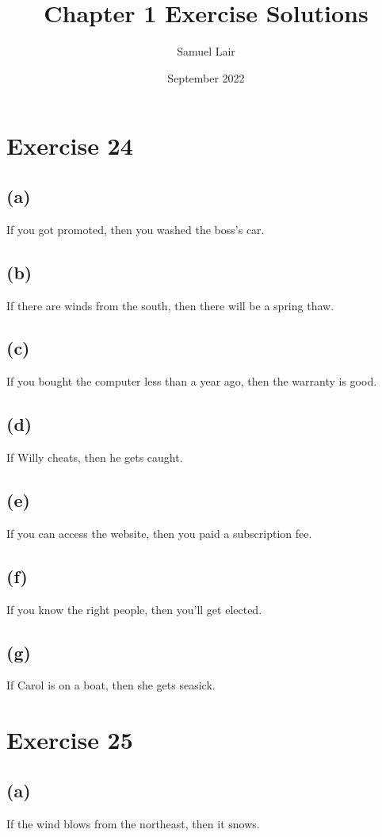 \documentclass{article}
\title{Chapter 1 Exercise Solutions}
\author{Samuel Lair}
\date{September 2022}
\begin{document}
	
	\maketitle
	\tableofcontents
	
	\pagebreak
	
	\section{Exercise 24}
	\subsection{(a)}
	If you got promoted, then you washed the boss's car.
	\subsection{(b)}
	If there are winds from the south, then there will be a spring thaw.
	\subsection{(c)}
	If you bought the computer less than a year ago, then the warranty is good.
	\subsection{(d)}
	If Willy cheats, then he gets caught.
	\subsection{(e)}
	If you can access the website, then you paid a subscription fee.
	\subsection{(f)}
	If you know the right people, then you'll get elected.
	\subsection{(g)}
	If Carol is on a boat, then she gets seasick.
	
	\pagebreak
	
	\section{Exercise 25}
	\subsection{(a)}
	If the wind blows from the northeast, then it snows.
\end{document}

